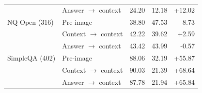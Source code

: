 \begin{table}[t]
\begin{tabular}{@{}llrrr@{}}
         & Answer $\to$ context & 24.20 & 12.18 & +12.02 \\
        \addlinespace
        NQ-Open (316) & Pre-image & 38.80 & 47.53 & -8.73 \\
         & Context $\to$ context & 42.22 & 39.62 & +2.59 \\
         & Answer $\to$ context & 43.42 & 43.99 & -0.57 \\
        \addlinespace
        SimpleQA (402) & Pre-image & 88.06 & 32.19 & +55.87 \\
         & Context $\to$ context & 90.03 & 21.39 & +68.64 \\
         & Answer $\to$ context & 87.78 & 21.94 & +65.84 \\
        \bottomrule
    \end{tabular}
\end{table}
